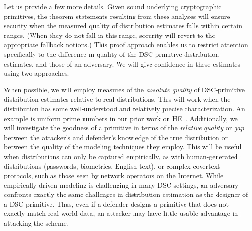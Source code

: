 Let us provide a few more details. 
Given sound underlying cryptographic primitives, the theorem
statements resulting from these analyses 
will ensure security when the measured quality of distribution
estimates falls within certain ranges.  
(When they do not fall in
this range, security will revert to the appropriate fallback notions.)
This proof approach 
enables us to restrict attention specifically to the difference in
quality of the DSC-primitive
distribution estimates, and those of an adversary. 
We will give confidence in these estimates using two approaches. 

When possible, we will employ measures of the {\em absolute quality} of
DSC-primitive distribution
estimates relative to real distributions. This will work when the distribution
has some well-understood and relatively precise characterization.  An example is
uniform prime numbers in our prior work on HE~\cite{HoneyEnc-EC:2014}.
Additionally, we will investigate the goodness of a primitive in terms of the {\em
relative quality} or {\em gap} between the attacker's and defender's knowledge
of the true distribution or between the quality of the modeling techniques they
employ. This will be useful when distributions can only be captured 
empirically, as with
human-generated distributions (passwords, biometrics, English text), 
or complex covertext
protocols, such as those seen by network operators on the Internet. 
While empirically-driven modeling is challenging in many DSC settings, an
adversary confronts exactly the same challenges in distribution estimation as
the designer of a DSC primitive. Thus, even if a defender designs a primitive
that does not exactly match real-world data, an attacker may have little usable
advantage in attacking the scheme. 

